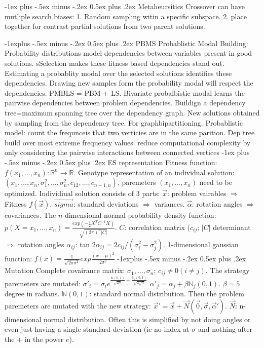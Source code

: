 \documentclass[8pt,landscape]{extarticle}
\makeatletter
\renewcommand{\section}{\@startsection{section}{1}{0mm}%
                                {-1ex plus -.5ex minus -.2ex}%
                                {0.5ex plus .2ex}%
                                {\normalfont\large\bfseries}}
\renewcommand{\subsection}{\@startsection{subsection}{2}{0mm}%
                                {-1explus -.5ex minus -.2ex}%
                                {0.5ex plus .2ex}%
                                {\normalfont\normalsize\bfseries}}
\makeatother
\begin{document}
\begin{multicols}{3}
\section{Metaheursitics}
Crossover can have mutliple search biases:
1. Random sampling witin a specific subspace. 2. place together for contrast
partial solutions from two parent solutions.

\subsection{PBMS}
Probablistic Modal Building: Probability distributions model dependencies 
between variables present in good solutions. sSelection makes these fitness 
based dependencies stand out. Estimating a probablity modal over the selected
solutions identifies these dependencies. Drawing new samples form the probability
modal will respect the dependencies.
PMBLS = PBM + LS. Bivariate probalbistic modal learns the pairwise dependencies
between problem dependencies. Buildign a dependency tree=maximum spanning tree
over the dependency graph. New solutions obtained by sampling from the dependency
tree.
For graphbipartitioning. Probablistic model: count the frequnceis that two
verticies are in the same parition. Dep tree build over most extreme frequency
values. reduce computational complexity by only considering the
pairwise interactions between connected vertices
\section{ES representation}
Fitness function: $f(x_1,\dots,x_n):\mathbb{R}^n\to \mathbb{R}$.
Genotype representation of an individual solution:
$(x_1,\dots,x_n,\sigma^2_1,\dots,\sigma^2_n, c_{12},\dots,c_{n-1,n})$,
paremeters $(x_1, \dots,x_n)$ need to be optimized.
Individiual solution consists of 3 parts: $\vec{x}$: problem vairables
$\Rightarrow$ Fitness $f(\vec{x})$. $\vec{sigma}$: standard deviations
$\Rightarrow$ variances. $\vec{\alpha}$: rotation angles $\Rightarrow$
covariances. The $n$-dimensional normal probability density function:
$p(X=x_1,\dots,x_n)=\frac{exp(-\frac{1}{2}X^TC^{-1}X)}{\sqrt{(2\pi)^n|C|}}$.
$C$: correlation matrix ($c_{ij}$; $|C|$ determinant $\Rightarrow$ rotation 
angles $\alpha_{ij}$: tan $2\alpha_{ij}=2c_{ij}/(\sigma^2_i-\sigma^2_j)$.
1-dimensional gaussian function:
$f(x)=\frac{1}{\sqrt{2\pi \sigma^2}}exp\frac{(x-\mu)^2}{2\sigma^2}$
\subsection{Mutation}
Complete covairance matrix: $\sigma_1,\dots,\sigma_n$; $c_{ij}\neq 0 (i\neq j)$.
The strategy paremeters are mutated:
$\sigma'_i=\sigma_ie^{
	\frac{\mathbb{N}(0,1)}{\sqrt{2n}}+
	\frac{\mathbb{N}_i(0,1)}{\sqrt{2\sqrt{n}}}
}$
$\alpha'_j=\alpha_j+\beta\mathbb{N}_j(0,1)$.
$\beta = 5$ degree in radians. $\mathbb{N}(0,1)$: standard normal
distribution. Then the problem paremeters are mutated with the new
strategy: $\vec{x}'=\vec{x}+\vec{N}(\vec{0},\vec{\sigma},\vec{\alpha}')$.
$\vec{N}$: n-dimensional normal distribution.
Often this is simplified by not doing angles or even just having a single
standard deviation (ie no index at $\sigma$ and nothing after the + 
in the power $e$).

\end{multicols}
\end{document}
